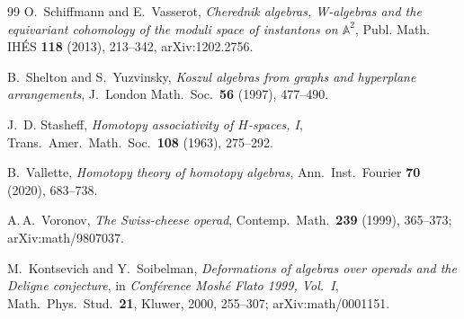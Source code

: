 \documentclass[11pt,reqno]{amsart}
\theoremstyle{definition}
\theoremstyle{remark}
\numberwithin{equation}{section}
\begin{document}
\begin{thebibliography}{99}
O.~Schiffmann and E.~Vasserot,
\emph{Cherednik algebras, W-algebras and the equivariant
cohomology of the moduli space of instantons on
$\mathbb{A}^2$},
Publ. Math. IH\'ES \textbf{118} (2013), 213--342,
arXiv:1202.2756.

B.~Shelton and S.~Yuzvinsky,
\emph{Koszul algebras from graphs and hyperplane arrangements},
J.\ London Math.\ Soc.\ \textbf{56} (1997), 477--490.

J.~D. Stasheff,
\emph{Homotopy associativity of $H$-spaces, I},
Trans.\ Amer.\ Math.\ Soc.\ \textbf{108} (1963), 275--292.

B.~Vallette,
\emph{Homotopy theory of homotopy algebras},
Ann.\ Inst.\ Fourier \textbf{70} (2020), 683--738.

A.\,A.~Voronov,
\emph{The Swiss-cheese operad},
Contemp.\ Math.\ \textbf{239} (1999), 365--373;
arXiv:math/9807037.

M.~Kontsevich and Y.~Soibelman,
\emph{Deformations of algebras over operads and the Deligne
conjecture},
in \emph{Conf\'erence Mosh\'e Flato 1999, Vol.~I}, Math.\ Phys.\
Stud.\ \textbf{21}, Kluwer, 2000, 255--307;
arXiv:math/0001151.

\end{thebibliography}
\end{document}
